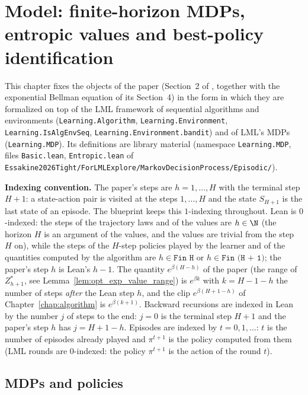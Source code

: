 \chapter{Model: finite-horizon MDPs, entropic values and best-policy identification}
\label{chap:mdp}

This chapter fixes the objects of the paper (Section~2 of \cite{essakine2026tight}, together
with the exponential Bellman equation of its Section~4) in the form in which they are
formalized on top of the LML framework of sequential algorithms and environments
(\texttt{Learning.Algorithm}, \texttt{Learning.Environment}, \texttt{Learning.IsAlgEnvSeq},
\texttt{Learning.Environment.bandit}) and of LML's MDPs (\texttt{Learning.MDP}). Its definitions are
library material (namespace \texttt{Learning.MDP}, files \texttt{Basic.lean},
\texttt{Entropic.lean} of \texttt{Essakine2026Tight/ForLMLExplore/MarkovDecisionProcess/Episodic/}).

\textbf{Indexing convention.} The paper's steps are $h = 1, \dots, H$ with the terminal step
$H + 1$: a state-action pair is visited at the steps $1, \dots, H$ and the state $S_{H+1}$ is
the last state of an episode. The blueprint keeps this $1$-indexing throughout. Lean is
$0$-indexed: the steps of the trajectory laws and of the values are $h \in \N$ (the horizon
$H$ is an argument of the values, and the values are trivial from the step $H$ on), while the
steps of the $H$-step policies played by the learner and of the quantities computed by the
algorithm are $h \in \texttt{Fin H}$ or $h \in \texttt{Fin (H + 1)}$; the paper's step $h$ is
Lean's $h - 1$. The quantity
$e^{\beta(H - h)}$ of the paper (the range of $Z^*_{h+1}$, see Lemma~\ref{lem:opt_exp_value_range})
is $e^{\beta k}$ with $k = H - 1 - h$ the number of steps \emph{after} the Lean step $h$, and the
clip $e^{\beta(H + 1 - h)}$ of Chapter~\ref{chap:algorithm} is $e^{\beta(k + 1)}$. Backward
recursions are indexed in Lean by the number $j$ of steps to the end: $j = 0$ is the terminal
step $H + 1$ and the paper's step $h$ has $j = H + 1 - h$. Episodes are indexed by
$t = 0, 1, \dots$: $t$ is the number of episodes already played and $\pi^{t+1}$ is the policy
computed from them (LML rounds are $0$-indexed: the policy $\pi^{t+1}$ is the action of the
round $t$).

\section{MDPs and policies}
\label{sec:mdp_mdps}

